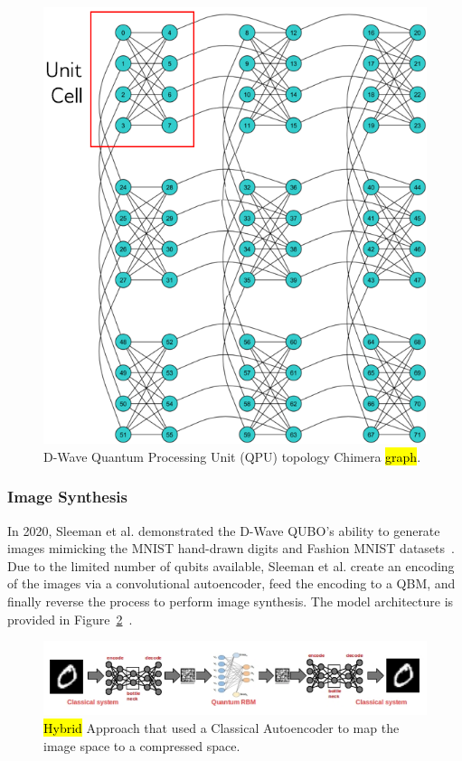 \documentclass[technologies,article,accept,pdftex,moreauthors]{Definitions/mdpi}
\newcommand{\figref}[1]{Figure~\ref{#1}}
\begin{document}
\begin{figure}[H]
    \includegraphics[width=0.95\columnwidth]{chimera.png}
    \caption{\label{fig:chimera}D-Wave Quantum Processing Unit (QPU) topology Chimera \hl{graph}.}
\end{figure} %



\subsubsection{Image Synthesis}
In 2020, Sleeman et al. demonstrated the D-Wave QUBO's ability to generate images mimicking the MNIST hand-drawn digits and Fashion MNIST datasets~\cite{qmlimggen}. Due to the limited number of qubits available, Sleeman et al. create an encoding of the images via a convolutional autoencoder, feed the encoding to a QBM, and finally reverse the process to perform image synthesis. The model architecture is provided in \figref{fig:hybridML}~\cite{qmlimggen}.

\begin{figure}[H]
    \includegraphics[width=\textwidth]{qmlimgimg.png}
    \caption{\label{fig:hybridML}\hl{Hybrid} %
 Approach that used a Classical Autoencoder to map the image space to a compressed space.}
\end{figure}
\end{document}
